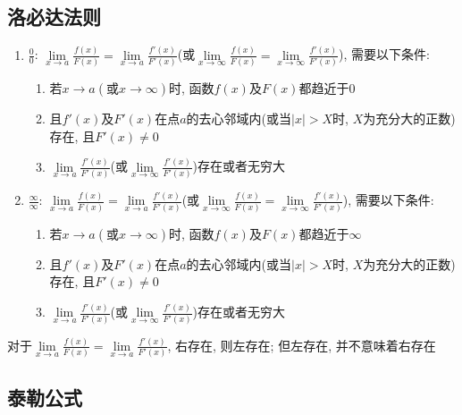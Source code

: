 \subsection{洛必达法则}
\begin{enumerate}
\item $ \frac{0}{0} $: $ \lim\limits_{x\rightarrow a}\frac{f(x)}{F(x)}=\lim\limits_{x\rightarrow a}\frac{f'(x)}{F'(x)} $(或$ \lim\limits_{x\rightarrow \infty}\frac{f(x)}{F(x)}=\lim\limits_{x\rightarrow \infty}\frac{f'(x)}{F'(x)} $), 需要以下条件:
\begin{enumerate}
\item 若$ x\rightarrow a(\text{或}x\rightarrow \infty) $时, 函数$ f(x) $及$ F(x) $都趋近于$ 0 $
\item 且$ f'(x) $及$ F'(x) $在点$ a $的去心邻域内(或当$ |x|>X $时, $ X $为充分大的正数)存在, 且$ F'(x)\neq 0 $
\item $ \lim\limits_{x\rightarrow a}\frac{f'(x)}{F'(x)} $(或$ \lim\limits_{x\rightarrow \infty}\frac{f'(x)}{F'(x)} $)存在或者无穷大
\end{enumerate}
\item $ \frac{\infty}{\infty} $: $ \lim\limits_{x\rightarrow a}\frac{f(x)}{F(x)}=\lim\limits_{x\rightarrow a}\frac{f'(x)}{F'(x)} $(或$ \lim\limits_{x\rightarrow \infty}\frac{f(x)}{F(x)}=\lim\limits_{x\rightarrow \infty}\frac{f'(x)}{F'(x)} $), 需要以下条件:
\begin{enumerate}
\item 若$ x\rightarrow a(\text{或}x\rightarrow \infty) $时, 函数$ f(x) $及$ F(x) $都趋近于$ \infty $
\item 且$ f'(x) $及$ F'(x) $在点$ a $的去心邻域内(或当$ |x|>X $时, $ X $为充分大的正数)存在, 且$ F'(x)\neq 0 $
\item $ \lim\limits_{x\rightarrow a}\frac{f'(x)}{F'(x)} $(或$ \lim\limits_{x\rightarrow \infty}\frac{f'(x)}{F'(x)} $)存在或者无穷大
\end{enumerate}
\end{enumerate}
\begin{tcolorbox}
对于$ \lim\limits_{x\rightarrow a}\frac{f(x)}{F(x)}=\lim\limits_{x\rightarrow a}\frac{f'(x)}{F'(x)} $, 右存在, 则左存在; 但左存在, 并不意味着右存在
\end{tcolorbox}
\subsection{泰勒公式}
